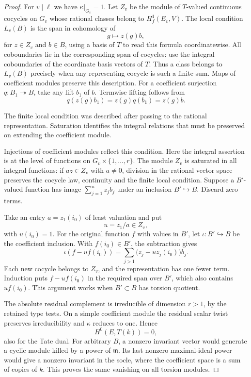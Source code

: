 \begin{proof}
For \(v\mid\ell\) we have \(\kappa|_{G_v}=1\). Let
\(Z_v\) be the module of \(T\)-valued continuous cocycles on
\(G_v\) whose rational classes belong to \(H^1_f(E_v,V)\).
The local condition \(L_v(B)\) is the span in cohomology of
\[
 g\mapsto z(g)b,
\]
for \(z\in Z_v\) and \(b\in B\),
using a basis of \(T\) to read this formula coordinatewise.
All coboundaries lie in the corresponding span of cocycles:
use the integral coboundaries of the coordinate basis vectors
of \(T\). Thus a class belongs to \(L_v(B)\) precisely when
any representing cocycle is such a finite sum. Maps of
coefficient modules preserve this description. For a coefficient surjection \(q:B_1\twoheadrightarrow B\), take any lift \(b_1\) of \(b\). Termwise lifting follows from
\[
 q(z(g)b_1)=z(g)q(b_1)=z(g)b.
\]


The finite local condition was described after passing to the rational representation. Saturation identifies the integral relations that must be preserved on extending the coefficient module.

Injections of coefficient modules reflect this condition.
Here the integral assertion is at the level of functions on
\(G_v\times\{1,\ldots,r\}\). The module \(Z_v\) is saturated
in all integral functions: if \(az\in Z_v\) with \(a\ne0\),
division in the rational vector space preserves the cocycle
law, continuity and the finite local condition. Suppose a
\(B'\)-valued function has image \(\sum_{j=1}^n z_j b_j\)
under an inclusion \(B'\hookrightarrow B\). Discard zero
terms.

Take an entry \(a=z_1(i_0)\) of least valuation and put
\[
 u=z_1/a\in Z_v,
\]
with \(u(i_0)=1\). For the original function \(f\) with values in \(B'\), let
\(\iota:B'\hookrightarrow B\) be the coefficient inclusion.
With \(f(i_0)\in B'\), the subtraction gives
\[
 \iota\!\left(f-u f(i_0)\right)
  =\sum_{j>1}\bigl(z_j-u z_j(i_0)\bigr)b_j .
\]
Each new cocycle belongs to \(Z_v\), and the representation
has one fewer term. Induction puts \(f-u f(i_0)\) in the
required span over \(B'\), which also contains \(u f(i_0)\). This argument works when
\(B'\subset B\) has torsion quotient.

The absolute residual complement is irreducible of dimension
\(r>1\), by the retained type tests. On a simple coefficient
module the residual scalar twist preserves irreducibility and
\(\kappa\) reduces to one. Hence
\[
 H^0(E,T(k))=0,
\]
also for
the Tate dual. For arbitrary \(B\), a nonzero invariant vector
would generate a cyclic module killed by a power of
\(\mathfrak m\). Its last nonzero maximal-ideal power would
give a nonzero invariant in the socle, where the coefficient
space is a sum of copies of \(k\). This proves the same
vanishing on all torsion modules.


\end{proof}
